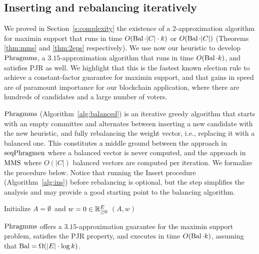 \subsection{Inserting and rebalancing iteratively}\label{s:315}

We proved in Section~\ref{s:complexity} the existence of a 2-approximation algorithm for maximin support that runs in time $O(\operatorname{Bal}\cdot |C|\cdot k)$ or $O(\operatorname{Bal}\cdot |C|)$ (Theorems \ref{thm:mms} and \ref{thm:2eps} respectively). 
We use now our heuristic to develop $\phragmms$, a $3.15$-approximation algorithm that runs in time $O(\operatorname{Bal}\cdot k)$, and satisfies PJR as well. 
We highlight that this is the fastest known election rule to achieve a constant-factor guarantee for maximin support, and that gains in speed are of paramount importance for our blockchain application, where there are hundreds of candidates and a large number of voters.

$\phragmms$ (Algorithm~\ref{alg:balanced}) is an iterative greedy algorithm that starts with an empty committee and alternates between inserting a new candidate with the new heuristic, and fully rebalancing the weight vector, i.e., replacing it with a balanced one. This constitutes a middle ground between the approach in $\operatorname{seqPhragmen}$ where a balanced vector is never computed, and the approach in $\operatorname{MMS}$ where $O(|C|)$ balanced vectors are computed per iteration. 
We formalize the procedure below. Notice that running the Insert procedure (Algorithm~\ref{alg:ins}) before rebalancing is optional, but the step simplifies the analysis and may provide a good starting point to the balancing algorithm.

\begin{algorithm}[htb]
\SetAlgoLined
{}
Initialize $A=\emptyset$\ and $w=0\in\mathbb{R}_{\geq 0}^E$\;
\Return $(A,w)$\;
\caption{$\phragmms$}
\label{alg:balanced}
\end{algorithm}

\begin{theorem}\label{thm:315}
$\phragmms$ offers a $3.15$-approximation guarantee for the maximin support problem, satisfies the PJR property, and executes in time $O(\operatorname{Bal}\cdot k)$, assuming that $\operatorname{Bal}= \Omega(|E|\cdot \log k)$.
\end{theorem}

